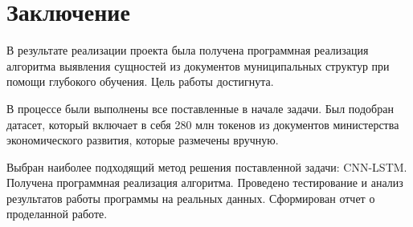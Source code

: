 \documentclass{article}
\begin{document}
\section{Заключение}
В результате реализации проекта была получена программная реализация алгоритма выявления сущностей из документов муниципальных структур при помощи глубокого обучения. Цель работы достигнута. 

В процессе были выполнены все поставленные в начале задачи.  Был подобран датасет, который включает в себя 280 млн токенов из документов министерства экономического развития, которые размечены вручную.

 Выбран наиболее подходящий метод решения поставленной задачи: CNN-LSTM.
Получена программная реализация алгоритма. Проведено тестирование и анализ результатов работы программы на реальных данных. Сформирован отчет о проделанной работе.


\end{document}
